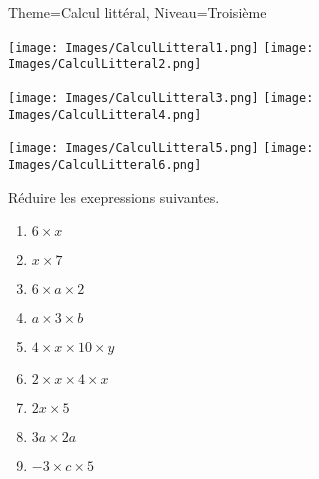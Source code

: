 \documentclass[11pt]{article}
\begin{document}
\begin{multicols}{2}

    \begin{Maquette}[Fiche]{Theme=Calcul littéral, Niveau=Troisième}

        \begin{exercice}
            \texttt{[image: Images/CalculLitteral1.png]}
            \texttt{[image: Images/CalculLitteral2.png]}
        \end{exercice}

        \begin{exercice}
            \texttt{[image: Images/CalculLitteral3.png]}
            \texttt{[image: Images/CalculLitteral4.png]}
        \end{exercice}

        \begin{exercice}
            \texttt{[image: Images/CalculLitteral5.png]}
            \texttt{[image: Images/CalculLitteral6.png]}
        \end{exercice}

        \begin{exercice}
            Réduire les exepressions suivantes.
            \begin{multicols}{2}
                \begin{enumerate}[label=\textbf{\alph*.}]
                    \item $6\times x$
                    \item $x \times 7$
                    \item $6\times a \times 2$
                    \item $a \times 3 \times b$
                    \item $4\times x \times 10\times y$
                    \item $2\times x \times 4 \times x$
                    \item $2x\times 5$
                    \item $3a \times 2a$
                    \item $-3 \times c \times 5$
                \end{enumerate}
            \end{multicols}
        \end{exercice}



\end{Maquette}
\end{multicols}
\end{document}
